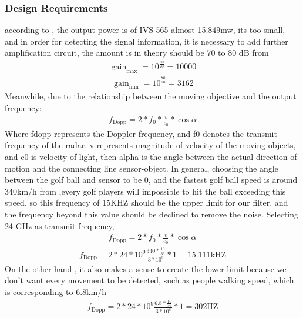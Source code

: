 \subsubsection{Design Requirements}
according to \textcite{IVS-565}, the output power is of IVS-565 almost 15.849mw, its too small, and in order for detecting the signal information, it is necessary to add further amplification circuit, the amount is in theory should be 70 to 80 dB from \textcite{Application_Note_I}
\begin{align}
\operatorname{gain}_{\max }=10^{\frac{80}{20}}=10000    
\end{align}
\begin{align}
\operatorname{gain}_{\min}=10^{\frac{70}{20}}=3162    
\end{align}
Meanwhile, due to the relationship between the moving objective and the output frequency:
\begin{align}
f_{\text {Dopp}}=2 * f_{0} * \frac{v}{c_{0}} * \cos \alpha
\end{align}
Where fdopp represents the Doppler frequency, and  f0 denotes the transmit frequency of the radar. v represents magnitude of velocity of the moving objects, and c0 is velocity of light, then alpha is the angle between the actual direction of motion and the connecting line sensor-object.
In general, choosing the angle between the golf ball and sensor to be 0, and the fastest golf ball speed is around 340km/h from \textcite{kobayashi1988golf},every golf players will impossible to hit the ball exceeding this speed, so this frequency of 15KHZ should be the upper limit for our filter, and the frequency beyond this value should be declined to remove the noise. Selecting 24 GHz as transmit frequency\textcite{Application_Note_I},
\begin{align}
f_{\text {Dopp}}=2 * f_{0} * \frac{v}{c_{0}} * \cos \alpha_{ }
\end{align}
\begin{align}
f_{\text {Dopp}}=2 * 24 * 10^{9} \frac{340 * \frac{10}{36}}{3 * 10^{8}} * 1=15.111 \mathrm{kHZ}
\end{align}
 On the other hand , it also makes a sense to create the lower limit because we don’t want every movement to be detected, such as people walking speed, which is corresponding to 6.8km/h
 \begin{align}
f_{\text {Dopp}}=2 * 24 * 10^{9} \frac{6.8 * \frac{10}{36}}{3 * 10^{8}} * 1=302 \mathrm{HZ}
\end{align}
